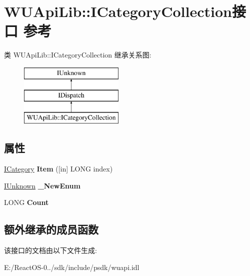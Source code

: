 \hypertarget{interface_w_u_api_lib_1_1_i_category_collection}{}\section{W\+U\+Api\+Lib\+:\+:I\+Category\+Collection接口 参考}
\label{interface_w_u_api_lib_1_1_i_category_collection}
类 W\+U\+Api\+Lib\+:\+:I\+Category\+Collection 继承关系图\+:\begin{figure}[H]
\begin{center}
\leavevmode
\includegraphics[height=3.000000cm]{interface_w_u_api_lib_1_1_i_category_collection}
\end{center}
\end{figure}
\subsection*{属性}
\begin{DoxyCompactItemize}
\item 
\mbox{\label{interface_w_u_api_lib_1_1_i_category_collection_a50926bdb8f8329dea4b034bab7e9c2d3}} 
\hyperlink{interface_w_u_api_lib_1_1_i_category}{I\+Category} {\bfseries Item} (\mbox{[}in\mbox{]} L\+O\+NG index)
\item 
\mbox{\label{interface_w_u_api_lib_1_1_i_category_collection_ad13b30200080d5030077f19d647a604f}} 
\hyperlink{interface_i_unknown}{I\+Unknown} {\bfseries \+\_\+\+New\+Enum}
\item 
\mbox{\label{interface_w_u_api_lib_1_1_i_category_collection_a965aa7ddf79248e7dbe761ced08437b4}} 
L\+O\+NG {\bfseries Count}
\end{DoxyCompactItemize}
\subsection*{额外继承的成员函数}


该接口的文档由以下文件生成\+:\begin{DoxyCompactItemize}
\item 
E\+:/\+React\+O\+S-\/0../sdk/include/psdk/wuapi.\+idl\end{DoxyCompactItemize}
